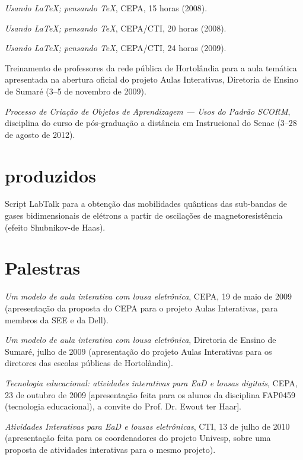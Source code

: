 \begin{compactitem}
	\item \textsl{Usando \LaTeX; pensando \TeX}, CEPA, 15 horas (2008).
	\item \textsl{Usando \LaTeX; pensando \TeX}, CEPA/CTI, 20 horas (2008).
	\item \textsl{Usando \LaTeX; pensando \TeX}, CEPA/CTI, 24 horas (2009).
	\item Treinamento de professores da rede pública de Hortolândia para a aula temática apresentada na abertura oficial do projeto Aulas Interativas, Diretoria de Ensino de Sumaré (3--5 de novembro de 2009).
	\item \textsl{Processo de Criação de Objetos de Aprendizagem --- Usos do Padrão SCORM}, disciplina do curso de pós-graduação a distância em  Instrucional do Senac (3--28 de agosto de 2012).
\end{compactitem}

\section*{ produzidos}

\begin{compactitem}
	\item Script LabTalk para a obtenção das mobilidades quânticas das sub-bandas de gases bidimensionais de elétrons a partir de oscilações de magnetoresistência (efeito Shubnikov-de Haas).
\end{compactitem}

\section*{Palestras}

\begin{compactitem}
	\item \textsl{Um modelo de aula interativa com lousa eletrônica}, CEPA, 19 de maio de 2009 (apresentação da proposta do CEPA para o projeto Aulas Interativas, para membros da SEE e da Dell).
	\item \textsl{Um modelo de aula interativa com lousa eletrônica}, Diretoria de Ensino de Sumaré, julho de 2009 (apresentação do projeto Aulas Interativas para os diretores das escolas públicas de Hortolândia).
	\item \textsl{Tecnologia educacional: atividades interativas para EaD e lousas digitais}, CEPA, 23 de outubro de 2009 [apresentação feita para os alunos da disciplina FAP0459 (tecnologia educacional), a convite do Prof. Dr. Ewout ter Haar].
	\item \textsl{Atividades Interativas para EaD e lousas eletrônicas}, CTI, 13 de julho de 2010 (apresentação feita para os coordenadores do projeto Univesp, sobre uma proposta de atividades interativas para o mesmo projeto).
\end{compactitem}

